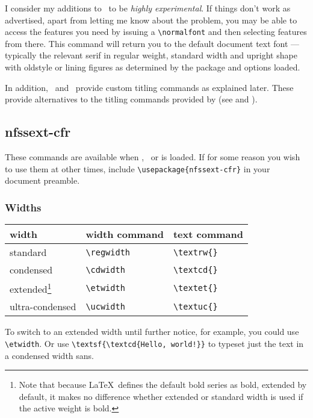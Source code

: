 \documentclass[11pt,british]{article}
\begin{document}
	I consider my additions to \ to be \emph{highly experimental}. If things don't work as advertised, apart from letting me know about the problem, you may be able to access the features you need by issuing a \verb|\normalfont| and then selecting features from there. This command will return you to the default document text font --- typically the relevant serif in regular weight, standard width and upright shape with oldstyle or lining figures as determined by the package and options loaded. 
	
	In addition, \ and \ provide custom titling commands as explained later. These provide alternatives to the titling commands provided by  (see  and ).

\subsection{nfssext-cfr}

These commands are available when , \ or  is loaded. If for some reason you wish to use them at other times, include \verb|\usepackage{nfssext-cfr}| in your document preamble.
	
\subsubsection{Widths}

	\begin{longtable}{lll}
		\toprule
		\textbf{width}	&	\textbf{width command}	&	\textbf{text command}\\\midrule\endhead
		\bottomrule\endfoot
		standard				&	\verb|\regwidth|					&	\verb|\textrw{}|\\
		condensed				&	\verb|\cdwidth|					&	\verb|\textcd{}|\\
		extended\footnote{Note that because \LaTeX\ defines the default bold series as bold, extended by default, it makes no difference whether extended or standard width is used if the active weight is bold.}				&	\verb|\etwidth| 					&	\verb|\textet{}|\\
		ultra-condensed	&	\verb|\ucwidth|					&	\verb|\textuc{}|\\
	\end{longtable}

	To switch to an extended width until further notice, for example, you could use \verb|\etwidth|. Or use \verb|\textsf{\textcd{Hello, world!}}| to typeset just the text \textsf{} in a condensed width sans.
	
\end{document}
